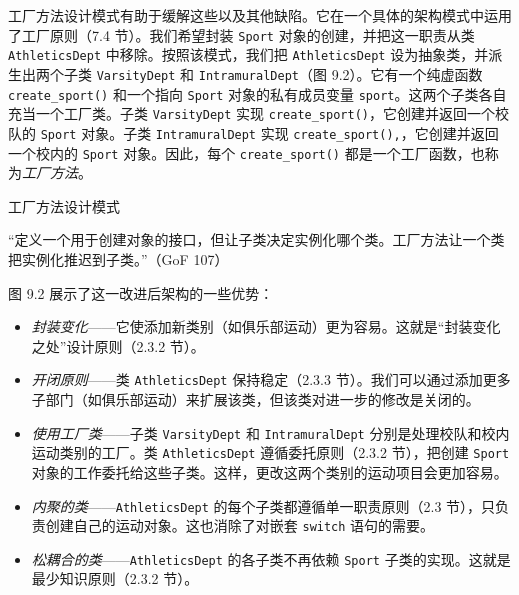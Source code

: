 工厂方法设计模式有助于缓解这些以及其他缺陷。它在一个具体的架构模式中运用了工厂原则（7.4 节）。我们希望封装 \texttt{Sport} 对象的创建，并把这一职责从类 \texttt{Athletics\allowbreak{}Dept} 中移除。按照该模式，我们把 \texttt{Athletics\allowbreak{}Dept} 设为抽象类，并派生出两个子类 \texttt{Varsity\allowbreak{}Dept} 和 \texttt{Intramural\allowbreak{}Dept}（图 9.2）。它有一个纯虚函数 \texttt{create\_\allowbreak{}sport(\allowbreak{})\allowbreak{}} 和一个指向 \texttt{Sport} 对象的私有成员变量 \texttt{sport}。这两个子类各自充当一个工厂类。子类 \texttt{Varsity\allowbreak{}Dept} 实现 \texttt{create\_\allowbreak{}sport(\allowbreak{})\allowbreak{}}，它创建并返回一个校队的 \texttt{Sport} 对象。子类 \texttt{Intramural\allowbreak{}Dept} 实现 \texttt{create\_\allowbreak{}sport(\allowbreak{})\allowbreak{},\allowbreak{}}，它创建并返回一个校内的 \texttt{Sport} 对象。因此，每个 \texttt{create\_\allowbreak{}sport(\allowbreak{})\allowbreak{}} 都是一个工厂函数，也称为\emph{工厂方法}。

\begin{mySidebar}{工厂方法设计模式}

“定义一个用于创建对象的接口，但让子类决定实例化哪个类。工厂方法让一个类把实例化推迟到子类。”（GoF 107）
\end{mySidebar}


图 9.2 展示了这一改进后架构的一些优势：

\begin{itemize}
\item \emph{封装变化}——它使添加新类别（如俱乐部运动）更为容易。这就是“封装变化之处”设计原则（2.3.2 节）。
\item \emph{开闭原则}——类 \texttt{Athletics\allowbreak{}Dept} 保持稳定（2.3.3 节）。我们可以通过添加更多子部门（如俱乐部运动）来扩展该类，但该类对进一步的修改是关闭的。
\item \emph{使用工厂类}——子类 \texttt{Varsity\allowbreak{}Dept} 和 \texttt{Intramural\allowbreak{}Dept} 分别是处理校队和校内运动类别的工厂。类 \texttt{Athletics\allowbreak{}Dept} 遵循委托原则（2.3.2 节），把创建 \texttt{Sport} 对象的工作委托给这些子类。这样，更改这两个类别的运动项目会更加容易。
\item \emph{内聚的类}——\texttt{Athletics\allowbreak{}Dept} 的每个子类都遵循单一职责原则（2.3 节），只负责创建自己的运动对象。这也消除了对嵌套 \texttt{switch} 语句的需要。
\item \emph{松耦合的类}——\texttt{Athletics\allowbreak{}Dept} 的各子类不再依赖 \texttt{Sport} 子类的实现。这就是最少知识原则（2.3.2 节）。
\end{itemize}

